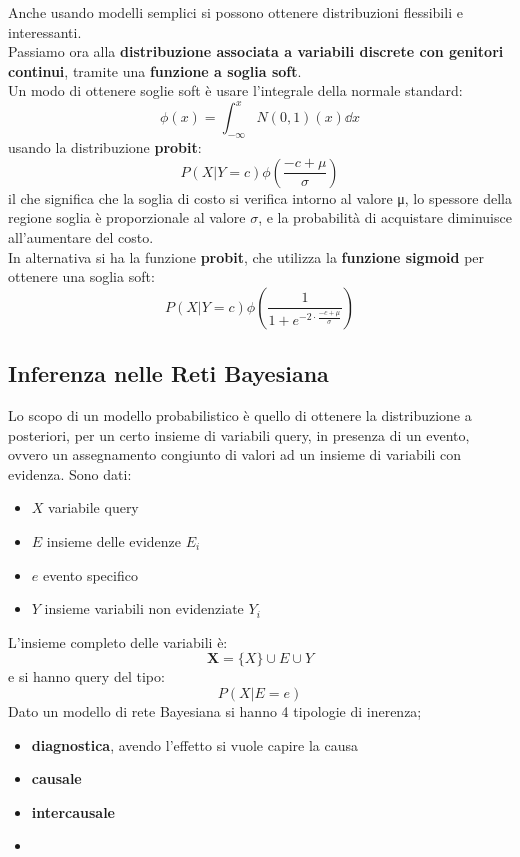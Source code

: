 \message{ !name(modprob.tex)}\documentclass[a4paper,12pt, oneside]{book}
\begin{document}
Anche usando modelli semplici si possono ottenere distribuzioni flessibili e
interessanti. \\
Passiamo ora alla \textbf{distribuzione associata a variabili discrete con
  genitori continui}, tramite una \textbf{funzione a soglia soft}. \\
Un modo di ottenere soglie soft è usare l'integrale della normale standard:
\[\phi(x)=\int_{-\infty}^x N(0,1)(x)\dd{x}\]
usando la distribuzione \textbf{probit}:
\[P(X|Y=c)\phi(\frac{-c+\mu}{\sigma})\]
il che significa che la soglia di costo si verifica intorno al valore μ, lo
spessore della regione soglia è 
proporzionale al valore $\sigma$, e la probabilità di acquistare diminuisce
all’aumentare del costo. \\
In alternativa si ha la funzione \textbf{probit}, che utilizza la
\textbf{funzione sigmoid} per ottenere una soglia soft:
\[P(X|Y=c)\phi(\frac{1}{1+e^{-2\cdot\frac{-c+\mu}{\sigma}}})\]
\subsection{Inferenza nelle Reti Bayesiana}
Lo scopo di un modello probabilistico è quello di ottenere la distribuzione a
posteriori, per un certo insieme di variabili query, in presenza di un evento,
ovvero un assegnamento congiunto di valori ad un insieme di variabili con
evidenza. Sono dati:
\begin{itemize}
  \item $X$ variabile query
  \item $E$ insieme delle evidenze $E_i$
  \item $e$ evento specifico
  \item $Y$ insieme variabili non evidenziate $Y_i$
\end{itemize}
L'insieme completo delle variabili è:
\[\mathbf{X}=\{X\}\cup E\cup Y\]
e si hanno query del tipo:
\[P(X|E=e)\]
Dato un modello di rete Bayesiana si hanno 4 tipologie di inerenza;
\begin{itemize}
  \item \textbf{diagnostica}, avendo l'effetto si vuole capire la causa
  \item \textbf{causale}
  \item \textbf{intercausale}
  \item 
\end{itemize}
\end{document}
